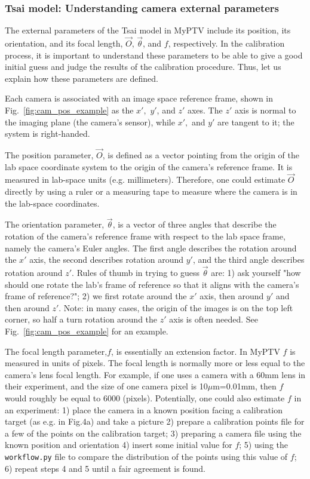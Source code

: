 \documentclass[10pt,a4paper]{article}
\begin{document}
\subsubsection{Tsai model: Understanding camera external parameters} \label{sec:camera_external_params}



The external parameters of the Tsai model in MyPTV include its position, its orientation, and its focal length, $\vec{O}$, $\vec{\theta}$, and $f$, respectively. In the calibration process, it is important to understand these parameters to be able to give a good initial guess and judge the results of the calibration procedure. Thus, let us explain how these parameters are defined.


Each camera is associated with an image space reference frame, shown in Fig.~\ref{fig:cam_pos_example} as the $x',$ $y'$, and $z'$ axes. The $z'$ axis is normal to the imaging plane (the camera's sensor), while $x',$ and $y'$ are tangent to it; the system is right-handed. 


The position parameter, $\vec{O}$, is defined as a vector pointing from the origin of the lab space coordinate system to the origin of the camera's reference frame. It is measured in lab-space units (e.g. millimeters). Therefore, one could estimate $\vec{O}$ directly by using a ruler or a measuring tape to measure where the camera is in the lab-space coordinates. 


The orientation parameter, $\vec{\theta}$, is a vector of three angles that describe the rotation of the camera's reference frame with respect to the lab space frame, namely the camera's Euler angles. The first angle describes the rotation around the $x'$ axis, the second describes rotation around $y'$, and the third angle describes rotation around $z'$. Rules of thumb in trying to guess $\vec{\theta}$ are: 1) ask yourself "how should one rotate the lab's frame of reference so that it aligns with the camera's frame of reference?"; 2) we first rotate around the $x'$ axis, then around $y'$ and then around $z'$. Note: in many cases, the origin of the images is on the top left corner, so half a turn rotation around the $z'$ axis is often needed. See Fig.~\ref{fig:cam_pos_example} for an example.


The focal length parameter,$f$, is essentially an extension factor. In MyPTV $f$ is measured in units of pixels. The focal length is normally more or less equal to the camera's lens focal length. For example, if one uses a camera with a 60mm lens in their experiment, and the size of one camera pixel is 10$\mu$m=0.01mm, then $f$ would roughly be equal to 6000 (pixels). Potentially, one could also estimate $f$ in an experiment: 1) place the camera in a known position facing a calibration target (as e.g. in Fig.4a) and take a picture 2) prepare a calibration points file for a few of the points on the calibration target; 3) preparing a camera file using the known position and orientation 4) insert some initial value for $f$; 5) using the \texttt{workflow.py} file to compare the distribution of the points using this value of $f$; 6) repeat steps 4 and 5 until a fair agreement is found.  
\end{document}
